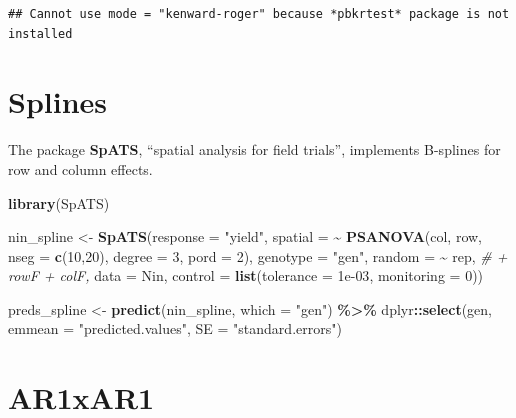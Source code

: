 \documentclass[
]{book}
\newenvironment{Shaded}{\begin{snugshade}}{\end{snugshade}}
\newcommand{\AttributeTok}[1]{\textcolor[rgb]{0.13,0.29,0.53}{#1}}
\newcommand{\CommentTok}[1]{\textcolor[rgb]{0.56,0.35,0.01}{\textit{#1}}}
\newcommand{\DecValTok}[1]{\textcolor[rgb]{0.00,0.00,0.81}{#1}}
\newcommand{\FloatTok}[1]{\textcolor[rgb]{0.00,0.00,0.81}{#1}}
\newcommand{\FunctionTok}[1]{\textcolor[rgb]{0.13,0.29,0.53}{\textbf{#1}}}
\newcommand{\NormalTok}[1]{#1}
\newcommand{\OtherTok}[1]{\textcolor[rgb]{0.56,0.35,0.01}{#1}}
\newcommand{\SpecialCharTok}[1]{\textcolor[rgb]{0.81,0.36,0.00}{\textbf{#1}}}
\newcommand{\StringTok}[1]{\textcolor[rgb]{0.31,0.60,0.02}{#1}}
\begin{document}
\begin{verbatim}
## Cannot use mode = "kenward-roger" because *pbkrtest* package is not installed
\end{verbatim}

\hypertarget{splines-1}{%
\section{Splines}\label{splines-1}}

The package \textbf{SpATS}, ``spatial analysis for field trials'', implements B-splines for row and column effects.

\begin{Shaded}
\begin{Highlighting}[]
\FunctionTok{library}\NormalTok{(SpATS)}

\NormalTok{nin\_spline }\OtherTok{\textless{}{-}} \FunctionTok{SpATS}\NormalTok{(}\AttributeTok{response =} \StringTok{"yield"}\NormalTok{, }
                    \AttributeTok{spatial =} \SpecialCharTok{\textasciitilde{}} \FunctionTok{PSANOVA}\NormalTok{(col, row, }\AttributeTok{nseg =} \FunctionTok{c}\NormalTok{(}\DecValTok{10}\NormalTok{,}\DecValTok{20}\NormalTok{),}
                                        \AttributeTok{degree =} \DecValTok{3}\NormalTok{, }\AttributeTok{pord =} \DecValTok{2}\NormalTok{), }
                    \AttributeTok{genotype =} \StringTok{"gen"}\NormalTok{,  }
                    \AttributeTok{random =} \SpecialCharTok{\textasciitilde{}}\NormalTok{ rep, }\CommentTok{\# + rowF + colF, }
                    \AttributeTok{data =}\NormalTok{ Nin, }
                    \AttributeTok{control =} \FunctionTok{list}\NormalTok{(}\AttributeTok{tolerance =} \FloatTok{1e{-}03}\NormalTok{, }\AttributeTok{monitoring =} \DecValTok{0}\NormalTok{))}

\NormalTok{preds\_spline }\OtherTok{\textless{}{-}} \FunctionTok{predict}\NormalTok{(nin\_spline, }\AttributeTok{which =} \StringTok{"gen"}\NormalTok{) }\SpecialCharTok{\%\textgreater{}\%} 
\NormalTok{  dplyr}\SpecialCharTok{::}\FunctionTok{select}\NormalTok{(gen, }\AttributeTok{emmean =} \StringTok{"predicted.values"}\NormalTok{, }\AttributeTok{SE =} \StringTok{"standard.errors"}\NormalTok{)}
\end{Highlighting}
\end{Shaded}

\hypertarget{ar1xar1}{%
\section{AR1xAR1}\label{ar1xar1}}
\end{document}
